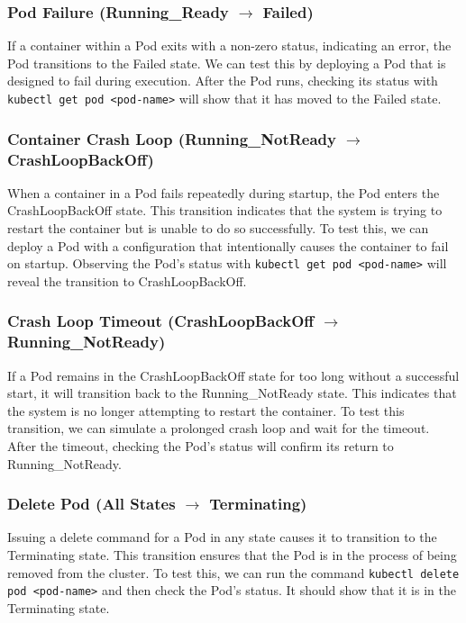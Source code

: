 \documentclass[main.tex]{subfiles}
\begin{document}
\subsubsection{Pod Failure (Running\_Ready $\rightarrow$ Failed)}
If a container within a Pod exits with a non-zero status, indicating an error, the Pod transitions to the Failed state. We can test this by deploying a Pod that is designed to fail during execution. After the Pod runs, checking its status with \texttt{kubectl get pod <pod-name>} will show that it has moved to the Failed state.

\subsubsection{Container Crash Loop (Running\_NotReady $\rightarrow$ CrashLoopBackOff)}
When a container in a Pod fails repeatedly during startup, the Pod enters the CrashLoopBackOff state. This transition indicates that the system is trying to restart the container but is unable to do so successfully. To test this, we can deploy a Pod with a configuration that intentionally causes the container to fail on startup. Observing the Pod’s status with \texttt{kubectl get pod <pod-name>} will reveal the transition to CrashLoopBackOff.

\subsubsection{Crash Loop Timeout (CrashLoopBackOff $\rightarrow$ Running\_NotReady)}
If a Pod remains in the CrashLoopBackOff state for too long without a successful start, it will transition back to the Running\_NotReady state. This indicates that the system is no longer attempting to restart the container. To test this transition, we can simulate a prolonged crash loop and wait for the timeout. After the timeout, checking the Pod’s status will confirm its return to Running\_NotReady.

\subsubsection{Delete Pod (All States $\rightarrow$ Terminating)}
Issuing a delete command for a Pod in any state causes it to transition to the Terminating state. This transition ensures that the Pod is in the process of being removed from the cluster. To test this, we can run the command \texttt{kubectl delete pod <pod-name>} and then check the Pod’s status. It should show that it is in the Terminating state.
\end{document}
